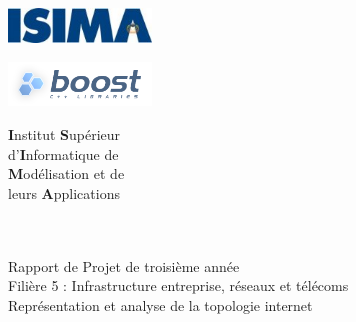 \begin{titlepage}
	\begin{minipage}{0.5\textwidth}
		\begin{flushleft} \large
			\includegraphics[width=3.8cm]{./schema/logo-isima.jpg}\\
		\end{flushleft}
	\end{minipage}
	\begin{minipage}{0.43\textwidth}
		\begin{flushright} \large
			\includegraphics[width=3.8cm]{schema/logo-boost.png}
		\end{flushright}
	\end{minipage}

	\begin{minipage}{0.5\textwidth}
		\begin{flushleft} \large
			\textbf{I}nstitut \textbf{S}upérieur\\
			d'\textbf{I}nformatique de\\
			\textbf{M}odélisation et de\\
			leurs \textbf{A}pplications\\
			~\\
		\end{flushleft}
	\end{minipage}
	\begin{minipage}{0.43\textwidth}
		\begin{flushright} \large
		\end{flushright}
	\end{minipage}


		\vfill
		\begin{center}
			\Hrule \\[0.4cm]
			\Large{Rapport de Projet de troisième année}\\		
			\Large Filière 5 : Infrastructure entreprise, réseaux et télécoms\\[1.0cm]
			\Huge{Représentation et analyse de la topologie internet}\\
			\Hrule\\[0.8cm]
\vfill 
		\end{center}
		

\end{titlepage}
